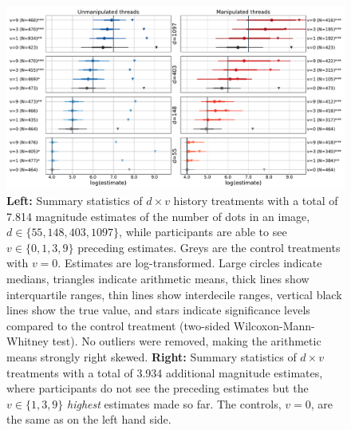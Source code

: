 \documentclass[9pt,twoside,lineno]{pnas-new}
\begin{document}
\begin{figure}
\centering
\includegraphics[width=1\linewidth]{summary_stats_plot.pdf}
\caption{\textbf{Left:} Summary statistics of $d \times v$ history treatments with a total of 7.814 magnitude estimates of the number of dots in an image, $d \in \{55,148,403,1097\}$, while participants are able to see $v \in \{0,1,3,9\}$ preceding estimates. Greys are the control treatments with $v=0$. Estimates are log-transformed. Large circles indicate medians, triangles indicate arithmetic means, thick lines show interquartile ranges, thin lines show interdecile ranges, vertical black lines show the true value, and stars indicate significance levels compared to the control treatment (two-sided Wilcoxon-Mann-Whitney test). No outliers were removed, making the arithmetic means strongly right skewed. \textbf{Right:} Summary statistics of $d \times v$ treatments with a total of 3.934 additional magnitude estimates, where participants do not see the preceding estimates but the $v \in \{1,3,9\}$ \textit{highest} estimates made so far. The controls, $v=0$, are the same as on the left hand side.}\label{fig:sum_stats}
\end{figure}
\end{document}

